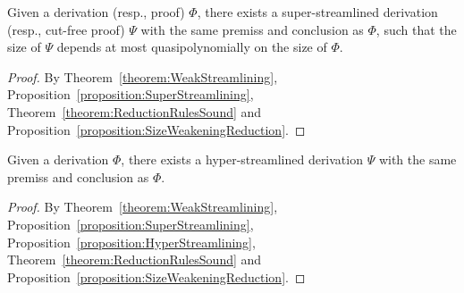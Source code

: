 \begin{corollary}\label{corollary:SuperStreamlining}
Given a derivation (resp., proof)\/ $\Phi$, there exists a super-streamlined derivation (resp., cut-free proof)\/ $\Psi$ with the same premiss and conclusion as\/ $\Phi$, such that the size of\/ $\Psi$ depends at most quasipolynomially on the size of\/ $\Phi$.
\end{corollary}

\begin{proof}
By Theorem~\vref{theorem:WeakStreamlining}, Proposition~\vref{proposition:SuperStreamlining}, Theorem~\vref{theorem:ReductionRulesSound} and Proposition~\vref{proposition:SizeWeakeningReduction}.
\end{proof}

\begin{corollary}\label{corollary:HyperStreamlining}
Given a derivation\/ $\Phi$, there exists a hyper-streamlined derivation\/ $\Psi$ with the same premiss and conclusion as\/ $\Phi$.
\end{corollary}

\begin{proof}
By Theorem~\vref{theorem:WeakStreamlining}, Proposition~\vref{proposition:SuperStreamlining}, Proposition~\vref{proposition:HyperStreamlining}, Theorem~\vref{theorem:ReductionRulesSound} and Proposition~\vref{proposition:SizeWeakeningReduction}.
\end{proof}

